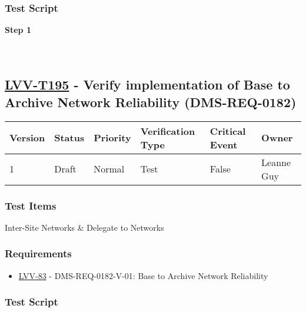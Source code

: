 \hypertarget{test-script-94}{%
\subsubsection{Test Script}\label{test-script-94}}

\textbf{Step 1}\\
~\\
~\\

\hypertarget{lvv-t195---verify-implementation-of-base-to-archive-network-reliability-dms-req-0182}{%
\subsection{\texorpdfstring{\href{https://jira.lsstcorp.org/secure/Tests.jspa\#/testCase/LVV-T195}{LVV-T195}
- Verify implementation of Base to Archive Network Reliability
(DMS-REQ-0182)}{LVV-T195 - Verify implementation of Base to Archive Network Reliability (DMS-REQ-0182)}}\label{lvv-t195---verify-implementation-of-base-to-archive-network-reliability-dms-req-0182}}

\begin{longtable}[]{@{}llllll@{}}
\toprule
Version & Status & Priority & Verification Type & Critical Event &
Owner\tabularnewline
\midrule
\endhead
1 & Draft & Normal & Test & False & Leanne Guy\tabularnewline
\bottomrule
\end{longtable}

\hypertarget{test-items-95}{%
\subsubsection{Test Items}\label{test-items-95}}

Inter-Site Networks \& Delegate to Networks

\hypertarget{requirements-95}{%
\subsubsection{Requirements}\label{requirements-95}}

\begin{itemize}
\tightlist
\item
  \href{https://jira.lsstcorp.org/browse/LVV-83}{LVV-83} -
  DMS-REQ-0182-V-01: Base to Archive Network Reliability
\end{itemize}

\hypertarget{test-script-95}{%
\subsubsection{Test Script}\label{test-script-95}}

